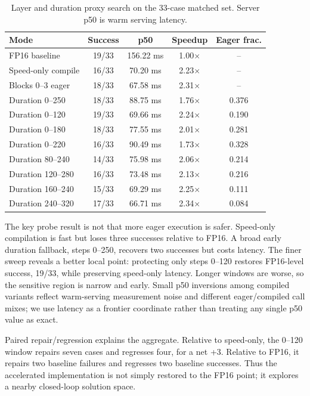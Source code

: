 \documentclass[letterpaper,10pt,twocolumn]{article}
\begin{document}
\begin{table}[H]
\centering
\caption{Layer and duration proxy search on the 33-case matched set. Server p50 is warm serving latency.}
\label{tab:icra-phase29}
\scriptsize
\setlength{\tabcolsep}{2.2pt}
\begin{tabular}{lcccc}
\toprule
Mode & Success & p50 & Speedup & Eager frac. \\
\midrule
FP16 baseline & 19/33 & 156.22 ms & 1.00$\times$ & -- \\
Speed-only compile & 16/33 & 70.20 ms & 2.23$\times$ & -- \\
Blocks 0--3 eager & 18/33 & 67.58 ms & 2.31$\times$ & -- \\
Duration 0--250 & 18/33 & 88.75 ms & 1.76$\times$ & 0.376 \\
Duration 0--120 & 19/33 & 69.66 ms & 2.24$\times$ & 0.190 \\
Duration 0--180 & 18/33 & 77.55 ms & 2.01$\times$ & 0.281 \\
Duration 0--220 & 16/33 & 90.49 ms & 1.73$\times$ & 0.328 \\
Duration 80--240 & 14/33 & 75.98 ms & 2.06$\times$ & 0.214 \\
Duration 120--280 & 16/33 & 73.48 ms & 2.13$\times$ & 0.216 \\
Duration 160--240 & 15/33 & 69.29 ms & 2.25$\times$ & 0.111 \\
Duration 240--320 & 17/33 & 66.71 ms & 2.34$\times$ & 0.084 \\
\bottomrule
\end{tabular}
\end{table}

The key probe result is not that more eager execution is safer. Speed-only compilation is fast but loses three successes relative to FP16. A broad early duration fallback, steps 0--250, recovers two successes but costs latency. The finer sweep reveals a better local point: protecting only steps 0--120 restores FP16-level success, 19/33, while preserving speed-only latency. Longer windows are worse, so the sensitive region is narrow and early. Small p50 inversions among compiled variants reflect warm-serving measurement noise and different eager/compiled call mixes; we use latency as a frontier coordinate rather than treating any single p50 value as exact.

Paired repair/regression explains the aggregate. Relative to speed-only, the 0--120 window repairs seven cases and regresses four, for a net +3. Relative to FP16, it repairs two baseline failures and regresses two baseline successes. Thus the accelerated implementation is not simply restored to the FP16 point; it explores a nearby closed-loop solution space.
\end{document}
